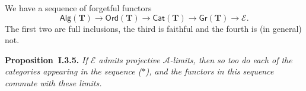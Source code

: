 \documentclass{article}
\newenvironment{itenv}[1]
  {\phantomsection\par\medskip\noindent\textbf{#1.}\itshape}
  {\par\medskip}
\newcommand{\TT}{\mathbf{T}}
\newcommand{\cat}[1]{\mathcal{#1}}
\newcommand{\Cat}[1]{\mathsf{#1}}
\newcommand{\Gr}[1]{\Cat{Gr}(#1)}
\newcommand{\Alg}[1]{\Cat{Alg}(#1)}
\newcommand{\Ord}[1]{\Cat{Ord}(#1)}
\begin{document}
We have a sequence of forgetful functors
\[
  \Alg{\TT}
  \to \Ord{\TT}
  \to \Cat{Cat}(\TT)
  \to \Gr{\TT}
  \to \cat{E}.
  \tag{$\ast$}
\]
The first two are full inclusions, the third is faithful and the fourth is (in general) not.

\begin{itenv}{Proposition~I.3.5}
  If $\cat{E}$ admits projective $\cat{A}$-limits, then so too do each of the categories appearing in the sequence ($\ast$), and the functors in this sequence commute with these limits.
\end{itenv}





\nocite{*}
\printbibliography[heading=bibintoc,title=Bibliography]
\end{document}
